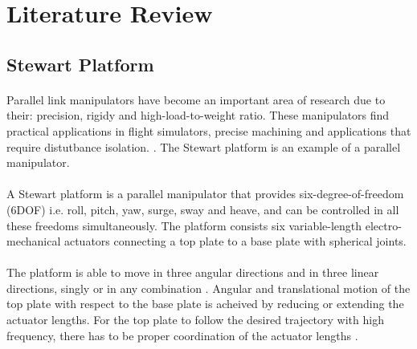 \section{Literature Review}
\subsection{Stewart Platform}
\paragraph{}Parallel link manipulators have become an important area of research due to their: precision, rigidy and high-load-to-weight ratio. These manipulators find practical applications in flight simulators, precise machining and applications that require distutbance isolation. \cite{iqbal_dynamic_2008}. The Stewart platform is an example of a parallel manipulator.
\paragraph{}A Stewart platform \cite{stewart1965platform} is a parallel
manipulator that provides six-degree-of-freedom (6DOF) i.e. roll, pitch, yaw, surge, sway and heave, and can be controlled in all these freedoms simultaneously. The platform consists six variable-length electro-mechanical actuators connecting a top plate to a base plate with spherical joints.
\paragraph{}The platform is able to move in three angular directions and in three linear directions, singly or in any combination \cite{stewart1965platform}. Angular and translational motion of the top plate with
respect to the base plate is acheived by reducing or extending the actuator lengths. For the top plate to follow the desired trajectory with high frequency, there has to be proper coordination of the actuator lengths \cite{iqbal_dynamic_2008}.

